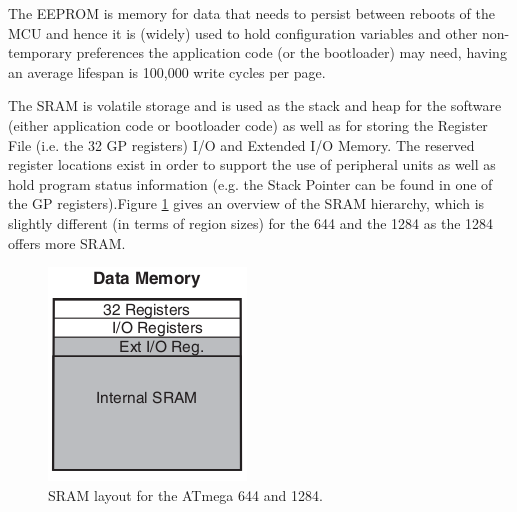 \documentclass[12pt,a4paper,twocolumn]{article}
\begin{document}
	The EEPROM is memory for data that needs to persist between reboots of the MCU and hence it is (widely) used to hold configuration variables and other non-temporary preferences the application code (or the bootloader) may need, having an average lifespan is 100,000 write cycles per page. 
	
	The SRAM is volatile storage and is used as the stack and heap for the software (either application code or bootloader code) as well as for storing the Register File (i.e. the 32 GP registers) I/O and Extended I/O Memory. The reserved register locations exist in order to support the use of peripheral units as well as hold program status information (e.g. the Stack Pointer can be found in one of the GP registers).Figure \ref{fig:stack} gives an overview of the SRAM hierarchy, which is slightly different (in terms of region sizes) for the 644 and the 1284 as the 1284 offers more SRAM.
	
	\begin{figure}
		\includegraphics[scale=1]{img/stack.png}
		\caption{SRAM layout for the ATmega 644 and 1284.}
		\label{fig:stack}		
	\end{figure}
	
\end{document}
